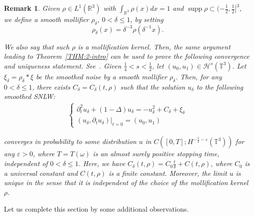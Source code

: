 \documentclass[%
11pt,  reqno]{amsart}
\newtheorem{remark}[theorem]{Remark}
\DeclareMathOperator*{\supp}{supp}
\newcommand{\1}{\hspace{0.2mm}\text{I}\hspace{0.2mm}}
\newcommand{\noi}{\noindent}
\newcommand{\R}{\mathbb{R}}
\newcommand{\T}{\mathbb{T}}
\newcommand{\dl}{\delta}
\newcommand{\Dl}{\Delta}
\newcommand{\eps}{\varepsilon}
\newcommand{\dt}{\partial_t}
\renewcommand{\o}{\omega}
\renewcommand{\H}{\mathcal{H}}
\numberwithin{equation}{section}
\numberwithin{theorem}{section}
\begin{document}
\begin{remark} \label{REM:uniq}\rm
Given  $\rho \in L^1(\R^3)$ 
with   $\int_{\R^3} \rho(x) dx = 1$
and $\supp \rho \subset (-\frac 12, \frac 12]^3$, 
we define a smooth mollifier $\rho_\dl$, $0< \dl \leq 1$, 
by setting
\[\rho_\dl(x) = \dl^{-3} \rho(\dl^{-1} x).\]

\noi
We also say that such $\rho$ is a mollification kernel. Then, the same argument leading to Theorem~\ref{THM:2-intro} can be used to prove the following convergence and uniqueness statement.
See~\cite{Hairer, CC}.
Given $\frac 14 < s < \frac 12$, 
let $(u_0, u_1) \in \H^{s}(\T^3)$.
Let $ \xi_\dl =  \rho_\dl * \xi$
be the smoothed noise
by a smooth mollifier $\rho_\dl$.
Then, for any $0< \dl \leq 1$, 
there exists $C_\dl=C_\dl(t, \rho)$
such that 
the solution $u_\dl$ to the following smoothed SNLW:
\begin{align*}
\begin{cases}
\dt^2 u_\dl + (1-  \Dl)  u_\dl  =  - u_\dl^2  + C_\dl+ \xi_\dl\\
(u_\dl, \dt u_\dl)|_{t = 0} = (u_0, u_1)
\end{cases}
\end{align*}

\noi
converges in probability  to some distribution $u$  in $C([0, T]; H^{-\frac 12 -\eps}(\T^3))$
for any $\eps > 0$, 
where $T = T(\o)$ is an almost surely positive stopping time, 
independent of $0< \dl \leq 1$.
Here, we have
$C_\dl(t, \rho) =  C_0 \frac{t}{\dl} + C(t, \rho)$, 
where $C_0$ is a universal constant and $C(t, \rho)$ is a finite constant.
Moreover, the limit $u$ is unique 
in the sense that it is independent
of the choice of the mollification kernel $\rho$.
\end{remark}




Let us complete this section by some additional observations.
\end{document}
